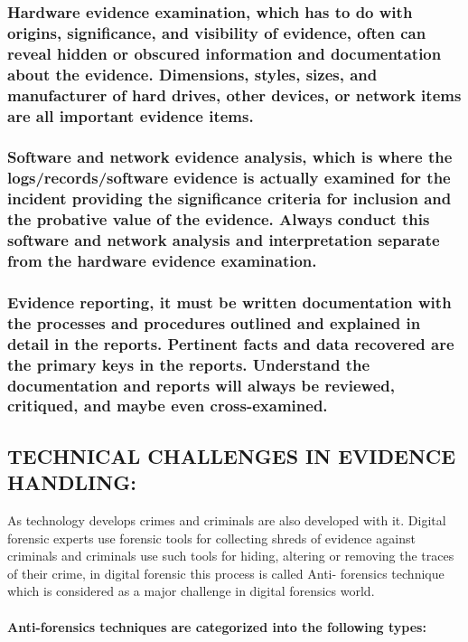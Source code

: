 \documentclass[10pt,british,english]{article}
\begin{document}
\subsubsection{Hardware evidence examination, which has to do with origins, significance,
and visibility of evidence, often can reveal hidden or obscured information
and documentation about the evidence. Dimensions, styles, sizes, and
manufacturer of hard drives, other devices, or network items are all
important evidence items.}

\subsubsection{Software and network evidence analysis, which is where the logs/records/software
evidence is actually examined for the incident providing the significance
criteria for inclusion and the probative value of the evidence. Always
conduct this software and network analysis and interpretation separate
from the hardware evidence examination.}

\subsubsection{Evidence reporting, it must be written documentation with the processes
and procedures outlined and explained in detail in the reports. Pertinent
facts and data recovered are the primary keys in the reports. Understand
the documentation and reports will always be reviewed, critiqued,
and maybe even cross-examined.}

\pagebreak{}

\subsection{TECHNICAL CHALLENGES IN EVIDENCE HANDLING:}

As technology develops crimes and criminals are also developed with
it. Digital forensic experts use forensic tools for collecting shreds
of evidence against criminals and criminals use such tools for hiding,
altering or removing the traces of their crime, in digital forensic
this process is called Anti- forensics technique which is considered
as a major challenge in digital forensics world. 

\paragraph*{Anti-forensics techniques are categorized into the following types:}
\end{document}
